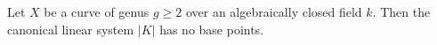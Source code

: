Let $X$ be a curve of genus $g \geqslant 2$ over an algebraically closed field $k$. Then the canonical linear system $|K|$ has no base points.
